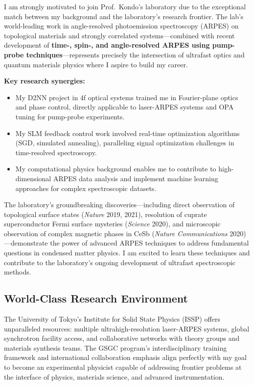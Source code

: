 \documentclass[11pt,a4paper]{article}
\begin{document}
I am strongly motivated to join Prof.~Kondo's laboratory due to the exceptional match between my background and the laboratory's research frontier. The lab's world-leading work in angle-resolved photoemission spectroscopy (ARPES) on topological materials and strongly correlated systems—combined with recent development of \textbf{time-, spin-, and angle-resolved ARPES using pump-probe techniques}—represents precisely the intersection of ultrafast optics and quantum materials physics where I aspire to build my career.

\textbf{Key research synergies:}
\begin{itemize}
    \item My D2NN project in 4f optical systems trained me in Fourier-plane optics and phase control, directly applicable to laser-ARPES systems and OPA tuning for pump-probe experiments.
    \item My SLM feedback control work involved real-time optimization algorithms (SGD, simulated annealing), paralleling signal optimization challenges in time-resolved spectroscopy.
    \item My computational physics background enables me to contribute to high-dimensional ARPES data analysis and implement machine learning approaches for complex spectroscopic datasets.
\end{itemize}

The laboratory's groundbreaking discoveries—including direct observation of topological surface states (\textit{Nature} 2019, 2021), resolution of cuprate superconductor Fermi surface mysteries (\textit{Science} 2020), and microscopic observation of complex magnetic phases in CeSb (\textit{Nature Communications} 2020)—demonstrate the power of advanced ARPES techniques to address fundamental questions in condensed matter physics. I am excited to learn these techniques and contribute to the laboratory's ongoing development of ultrafast spectroscopic methods.

\subsection{World-Class Research Environment}

The University of Tokyo's Institute for Solid State Physics (ISSP) offers unparalleled resources: multiple ultrahigh-resolution laser-ARPES systems, global synchrotron facility access, and collaborative networks with theory groups and materials synthesis teams. The GSGC program's interdisciplinary training framework and international collaboration emphasis align perfectly with my goal to become an experimental physicist capable of addressing frontier problems at the interface of physics, materials science, and advanced instrumentation.
\end{document}
